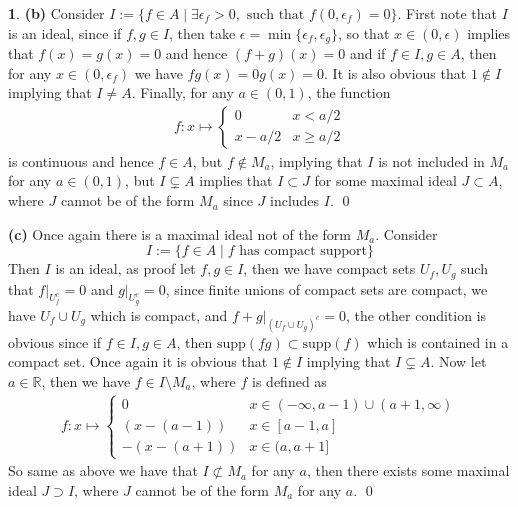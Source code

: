 \documentclass[11pt]{article}
\theoremstyle{definition}
\newtheorem{pb}{}
\newcommand{\set}[1]{\{#1\}}
\begin{document}
\begin{pb}
        \textbf{(b)} Consider \(I := \set{f \in A \mid \exists \epsilon_f > 0, \text{ such that } f(0,\epsilon_f) = 0}\). First note that \(I\) is an ideal, since if \(f,g \in I\), then take
        \(\epsilon = \min\set{\epsilon_f,\epsilon_g}\), so that \(x \in (0,\epsilon)\) implies that \(f(x) = g(x) = 0\) and hence \((f+g)(x) = 0\) and if \(f \in I, g \in A\), then for any \(x \in(0,\epsilon_f)\) we have \(fg(x) = 0g(x) = 0\). It is also obvious that \(1 \not \in I\) implying that \(I \neq A\). Finally, for any \(a \in (0,1)\), the function
        \begin{align*}
            f:x \mapsto \begin{cases}
                0 & x < a/2 \\
                x- a/2 & x \geq a/2
            \end{cases}
        \end{align*}
        is continuous and hence \(f \in A\), but \(f \not \in M_a\), implying that \(I\) is not included in \(M_a\) for any \(a \in (0,1)\), but \(I \subsetneq A\) implies that \(I \subset J\) for some maximal ideal \(J \subset A\), where \(J\) cannot be of the form \(M_a\) since \(J\) includes \(I\). \qed

        \textbf{(c)} Once again there is a maximal ideal not of the form \(M_a\).
        Consider \[I := \set{f \in A \mid f \text{ has compact support}}\]
        Then \(I\) is an ideal, as proof let \(f,g \in I\), then we have compact sets \(U_f,U_g\) such that \(f \vert_{U_f^c} = 0\) and \(g \vert_{U_g^c} = 0\), since finite unions of compact sets are compact, we have \(U_f \cup U_g\) which is compact, and \(f + g\vert_{(U_f \cup U_g)^c} = 0\), the other condition is obvious since if \(f \in I, g \in A\), then
        \(\text{supp}(fg) \subset \text{supp}(f)\) which is contained in a compact set. Once again it is obvious that \(1 \not \in I\) implying that \(I \subsetneq A\). Now let \(a \in \mathbb{R}\), then we have \(f \in I \setminus M_a\), where \(f\) is defined as
        \begin{align*}
            f: x\mapsto \begin{cases}
                0 & x \in (-\infty, a-1) \cup (a+1,\infty) \\
                (x - (a-1)) & x \in [a-1,a] \\
                -(x - (a+1)) & x \in (a,a+1]
            \end{cases}
        \end{align*}
        So same as above we have that \(I \not \subset M_a\) for any \(a\), then there exists some maximal ideal \(J \supset I\), where \(J\) cannot be of the form \(M_a\) for any \(a\). \qed
    \end{pb}
\end{document}
